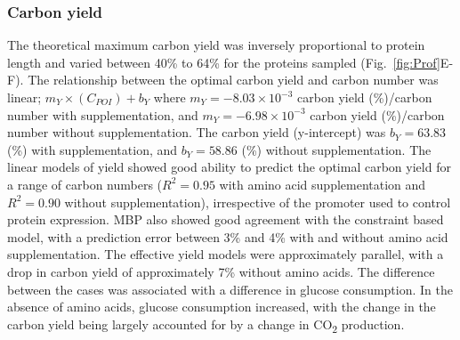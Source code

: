 \documentclass[journal=asbcd6,manuscript=article]{achemso}
\begin{document}

\subsubsection{Carbon yield}
The theoretical maximum carbon yield was inversely proportional to protein length and varied between 40\% to 64\% for the proteins sampled (Fig.~\ref{fig:Prof}E-F).
The relationship between the optimal carbon yield and carbon number was linear; $m_{Y}\times(C_{POI})+b_{Y}$ where $m_{Y} = -8.03\times10^{-3}$ carbon yield (\%)/carbon number with supplementation, and $m_{Y} = -6.98\times10^{-3}$ carbon yield (\%)/carbon number without supplementation.
The carbon yield (y-intercept) was $b_{Y} = 63.83$ (\%) with supplementation, and $b_{Y} = 58.86$ (\%) without supplementation.
The linear models of yield showed good ability to predict the optimal carbon yield for a range of carbon numbers ($R^{2} = 0.95$ with amino acid supplementation and $R^{2} = 0.90$ without supplementation), irrespective of the promoter used to control protein expression.
MBP also showed good agreement with the constraint based model, with a prediction error between 3\% and 4\% with and without amino acid supplementation.
The effective yield models were approximately parallel, with a drop in carbon yield of approximately 7\% without amino acids.
The difference between the cases was associated with a difference in glucose consumption.
In the absence of amino acids, glucose consumption increased, with the change in the carbon yield being largely accounted for by a change in CO\textsubscript{2} production.
\end{document}
